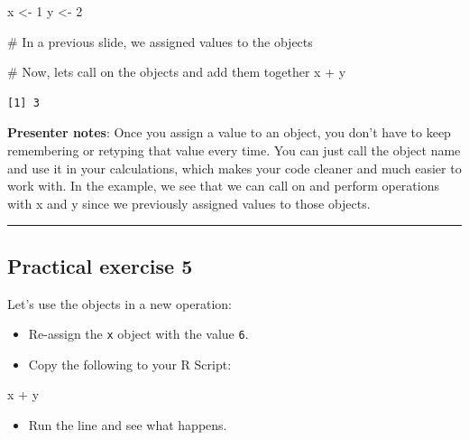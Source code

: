 \documentclass[
  letterpaper,
  DIV=11,
  numbers=noendperiod]{scrartcl}
\newenvironment{Shaded}{\begin{snugshade}}{\end{snugshade}}
\newcommand{\CommentTok}[1]{\textcolor[rgb]{0.37,0.37,0.37}{#1}}
\newcommand{\DecValTok}[1]{\textcolor[rgb]{0.68,0.00,0.00}{#1}}
\newcommand{\NormalTok}[1]{\textcolor[rgb]{0.00,0.23,0.31}{#1}}
\newcommand{\OtherTok}[1]{\textcolor[rgb]{0.00,0.23,0.31}{#1}}
\newcommand{\SpecialCharTok}[1]{\textcolor[rgb]{0.37,0.37,0.37}{#1}}
\providecommand{\tightlist}{%
  \setlength{\itemsep}{0pt}\setlength{\parskip}{0pt}}
\begin{document}
\begin{Shaded}
\begin{Highlighting}[]
\NormalTok{x }\OtherTok{\textless{}{-}} \DecValTok{1}
\NormalTok{y }\OtherTok{\textless{}{-}} \DecValTok{2}

\CommentTok{\# In a previous slide, we assigned values to the objects}

\CommentTok{\# Now, let\textquotesingle{}s call on the objects and add them together}
\NormalTok{x }\SpecialCharTok{+}\NormalTok{ y}
\end{Highlighting}
\end{Shaded}

\begin{verbatim}
[1] 3
\end{verbatim}

\textbf{Presenter notes}: Once you assign a value to an object, you
don't have to keep remembering or retyping that value every time. You
can just call the object name and use it in your calculations, which
makes your code cleaner and much easier to work with. In the example, we
see that we can call on and perform operations with x and y since we
previously assigned values to those objects.

\begin{center}\rule{0.5\linewidth}{0.5pt}\end{center}

\subsection{Practical exercise 5}\label{practical-exercise-5}

Let's use the objects in a new operation:

\begin{itemize}
\tightlist
\item[$\square$]
  Re-assign the \texttt{x} object with the value \texttt{6}.
\item[$\square$]
  Copy the following to your R Script:
\end{itemize}

\begin{Shaded}
\begin{Highlighting}[]
\NormalTok{x }\SpecialCharTok{+}\NormalTok{ y}
\end{Highlighting}
\end{Shaded}

\begin{itemize}
\tightlist
\item[$\square$]
  Run the line and see what happens.
\end{itemize}
\end{document}
